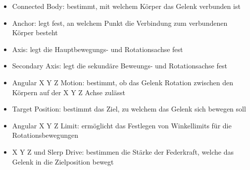 \begin{itemize}
  \item Connected Body: bestimmt, mit welchem Körper das Gelenk verbunden ist
  \item Anchor: legt fest, an welchem Punkt die Verbindung zum verbundenen Körper besteht
  \item Axis: legt die Hauptbewegungs- und Rotationsachse fest
  \item Secondary Axis: legt die sekundäre Beweungs- und Rotationsachse fest
  \item Angular X Y Z Motion: bestimmt, ob das Gelenk Rotation zwischen den Körpern auf der X Y Z Achse zulässt
  \item Target Position: bestimmt das Ziel, zu welchem das Gelenk sich bewegen soll
  \item Angular X Y Z Limit: ermöglicht das Festlegen von Winkellimits für die Rotationsbewegungen
  \item X Y Z  und Slerp Drive: bestimmen die Stärke der Federkraft, welche das Gelenk in die Zielposition bewegt
\end{itemize}